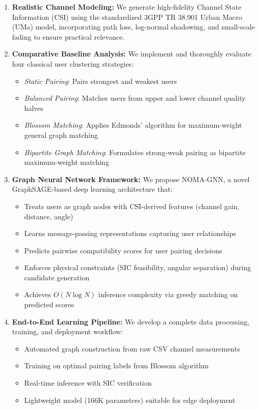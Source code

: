 \begin{enumerate}
    \item \textbf{Realistic Channel Modeling:} We generate high-fidelity Channel State Information (CSI) using the standardized 3GPP TR 38.901 Urban Macro (UMa) model, incorporating path loss, log-normal shadowing, and small-scale fading to ensure practical relevance.
    
    \item \textbf{Comparative Baseline Analysis:} We implement and thoroughly evaluate four classical user clustering strategies:
    \begin{itemize}
        \item \emph{Static Pairing}: Pairs strongest and weakest users
        \item \emph{Balanced Pairing}: Matches users from upper and lower channel quality halves
        \item \emph{Blossom Matching}: Applies Edmonds' algorithm for maximum-weight general graph matching
        \item \emph{Bipartite Graph Matching}: Formulates strong-weak pairing as bipartite maximum-weight matching
    \end{itemize}
    
    \item \textbf{Graph Neural Network Framework:} We propose NOMA-GNN, a novel GraphSAGE-based deep learning architecture that:
    \begin{itemize}
        \item Treats users as graph nodes with CSI-derived features (channel gain, distance, angle)
        \item Learns message-passing representations capturing user relationships
        \item Predicts pairwise compatibility scores for user pairing decisions
        \item Enforces physical constraints (SIC feasibility, angular separation) during candidate generation
        \item Achieves $O(N \log N)$ inference complexity via greedy matching on predicted scores
    \end{itemize}
    
    \item \textbf{End-to-End Learning Pipeline:} We develop a complete data processing, training, and deployment workflow:
    \begin{itemize}
        \item Automated graph construction from raw CSV channel measurements
        \item Training on optimal pairing labels from Blossom algorithm
        \item Real-time inference with SIC verification
        \item Lightweight model (166K parameters) suitable for edge deployment
    \end{itemize}
    

\end{enumerate}
